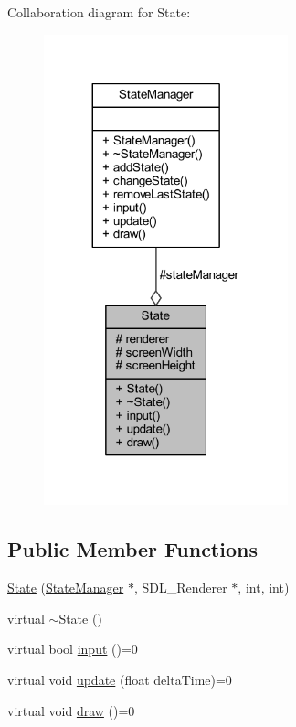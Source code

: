 Collaboration diagram for State\+:
\nopagebreak
\begin{figure}[H]
\begin{center}
\leavevmode
\includegraphics[width=200pt]{class_state__coll__graph}
\end{center}
\end{figure}
\subsection*{Public Member Functions}
\begin{DoxyCompactItemize}
\item 
\hyperlink{class_state_a68fb4089a66325a22f15311356e9df87}{State} (\hyperlink{class_state_manager}{State\+Manager} $\ast$, S\+D\+L\+\_\+\+Renderer $\ast$, int, int)
\item 
virtual \hyperlink{class_state_afab438d92b90dc18d194dbd9c9c8bab3}{$\sim$\+State} ()
\item 
virtual bool \hyperlink{class_state_ac0dcfe3db8d012b37e6935f4f805ece7}{input} ()=0
\item 
virtual void \hyperlink{class_state_a8f582ba039a10fff9712b6a21ef22808}{update} (float delta\+Time)=0
\item 
virtual void \hyperlink{class_state_ae261605bc40b7e3959ce5df5457e4942}{draw} ()=0
\end{DoxyCompactItemize}
